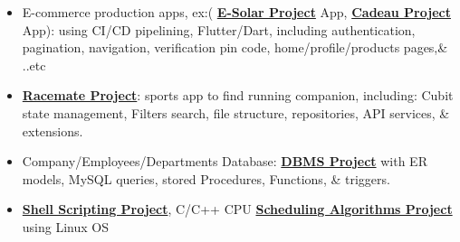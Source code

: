 



  \begin{itemize}[itemsep=0pt, parsep=0pt, topsep=0pt]
    \item{ \footnotesize E-commerce production apps, ex:( \textbf{\textcolor{cyan}{\href{https://play.google.com/store/apps/details?id=com.inova.esolar}{E-Solar Project}}} App, \textbf{\textcolor{cyan}{\href{https://play.google.com/store/apps/details?id=com.inova.cadeau}{Cadeau Project}}} App): using CI/CD pipelining, Flutter/Dart, including authentication, pagination, navigation, verification pin code, home/profile/products pages,\& ..etc}
    \item {\footnotesize \textbf{\textcolor{cyan}{\href{https://github.com/AsmaaJAH/race_app}{Racemate Project}}}: sports app to find running companion, including: Cubit state management, Filters search, file structure, repositories, API services, \& extensions.}
   \end{itemize}



\begin{itemize}[itemsep=0pt, parsep=0pt, topsep=0pt]
  \item{ \footnotesize Company/Employees/Departments Database: \textbf{\textcolor{cyan}{\href{https://github.com/AsmaaJAH/database-management-system-and-SQL-language/tree/main/labs/lab\%203}{DBMS Project}}}  with ER models, MySQL queries, stored Procedures, Functions, \& triggers. }
  \item {\footnotesize  \textbf{\textcolor{cyan}{\href{https://github.com/AsmaaJAH/Basic_ubuntu_shell}{Shell Scripting Project}}},  C/C++ CPU \textbf{\textcolor{cyan}{\href{https://github.com/AsmaaJAH/FCFS-and-RR-CPU-Scheduling}{Scheduling Algorithms Project}}} using Linux OS }
 \end{itemize}


